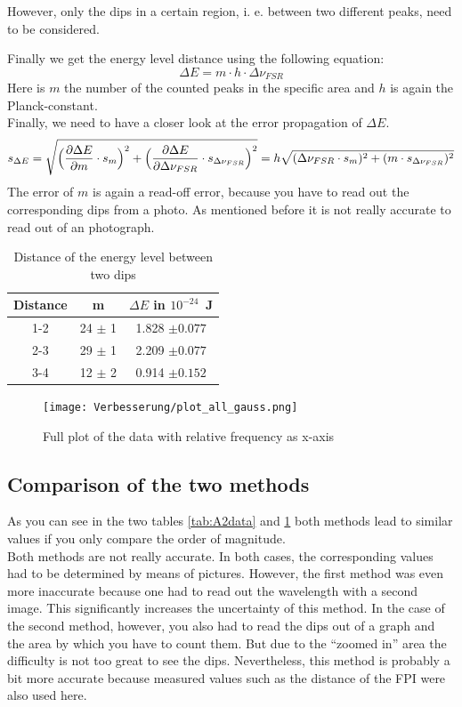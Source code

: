 However, only the dips in a certain region, i. e. between two different peaks, need to be considered.

Finally we get the energy level distance using the following equation:
\begin{equation}
    \Delta E = m \cdot h \cdot \Delta \nu_{FSR}
\end{equation}
Here is $m$ the number of the counted peaks in the specific area
and $h$ is again the Planck-constant.\\
Finally, we need to have a closer look at the error propagation of $\Delta E$.
\begin{equation}
    s_{\Delta E} = \sqrt{\Bigl(\frac{\partial \Delta E}{\partial m} \cdot s_m \Bigr) ^2 + \Bigl(\frac{\partial \Delta E}{\partial \Delta \nu_{FSR}} \cdot s_{\Delta \nu_{FSR}} \Bigr)^2 }
    = h \sqrt{(\Delta \nu_{FSR} \cdot s_m)^2+(m \cdot s_{\Delta \nu_{FSR}})^2}
\end{equation}
The error of $m$ is again a read-off error, because you have to read out the corresponding dips from a photo. As mentioned before it is not really accurate to read out of an photograph. 
\begin{table}[h]
    \centering
    \begin{tabular}{c||c|c}
        Distance & m& $\Delta E$ in $10^{-24}\,$ J \\
        \hline
          1-2 & 24 $\pm$ 1 & 1.828 $\pm  0.077$ \\
          2-3 & 29 $\pm$ 1 & 2.209 $\pm  0.077$ \\
          3-4 & 12 $\pm$ 2 & 0.914 $\pm  0.152$ \\
    \end{tabular}
        \caption{Distance of the energy level between two dips}
        \label{tab:A2second}
\end{table}
\begin{figure}[h]
    \centering\texttt{[image: Verbesserung/plot\_all\_gauss.png]}
    \caption{Full plot of the data with relative frequency as x-axis}
\end{figure}
\subsection{Comparison of the two methods}
As you can see in the two tables \ref{tab:A2data} and \ref{tab:A2second} both methods lead to 
similar values if you only compare the order of magnitude. \\ 
Both methods are not really accurate. In both cases, the corresponding values had to be determined by means of pictures. 
However, the first method was even more inaccurate because one had to read out the wavelength with a second image. 
This significantly increases the uncertainty of this method. 
In the case of the second method, however, you also had to read the dips out of a graph and the area by which you have to count them. 
But due to the “zoomed in” area the difficulty is not too great to see the dips.
Nevertheless, this method is probably a bit more accurate because measured values such as the distance of the FPI were also used here.
